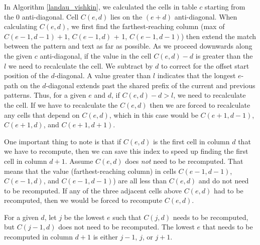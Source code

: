 In Algorithm \ref{landau_vishkin}, we calculated the cells in table $c$ starting from the 0 anti-diagonal.  Cell $C(e,d)$ lies on the $(e+d)$ anti-diagonal.
When calculating $C(e,d)$, we first find the farthest-reaching column (max of $C(e-1,d-1) + 1$, $C(e-1,d)$ + 1, $C(e-1,d-1)$) then extend the match between the pattern and text as far as possible.
As we proceed downwards along the given $c$ anti-diagonal, if the value in the cell $C(e,d) - d$ is greater than the $l$ we need to recalculate the cell.
We subtract by $d$ to correct for the offset start position of the $d$-diagonal.
A value greater than $l$ indicates that the longest $e$-path on the $d$-diagonal extends past the shared prefix of the current and previous patterns.
Thus, for a given $e$ and $d$, if $C(e,d) - d > l$, we need to recalculate the cell.
If we have to recalculate the $C(e,d)$ then we are forced to recalculate any cells that depend on $C(e,d)$, which in this case would be $C(e+1, d-1)$, $C(e+1, d)$, and $C(e+1, d+1)$.

One important thing to note is that if $C(e,d)$ is the first cell in column $d$ that we have to recompute, then we can save this index to speed up finding the first cell in column $d+1$.
Assume $C(e,d)$ does \emph{not} need to be recomputed.
That means that the value (farthest-reaching column) in cells $C(e-1,d-1)$, $C(e-1,d)$, and $C(e-1,d-1)$) are all less than $C(e,d)$ and do not need to be recomputed.
If any of the three adjacent cells above $C(e,d)$ had to be recomputed, then we would be forced to recompute $C(e,d)$.

\begin{theorem}
For a given $d$, let $j$ be the lowest $e$ such that $C(j,d)$ needs to be recomputed, but $C(j-1,d)$ does not need to be recomputed. The lowest $e$ that needs to be recomputed in column $d+1$ is either $j-1$, $j$, or $j+1$.
\end{theorem}

